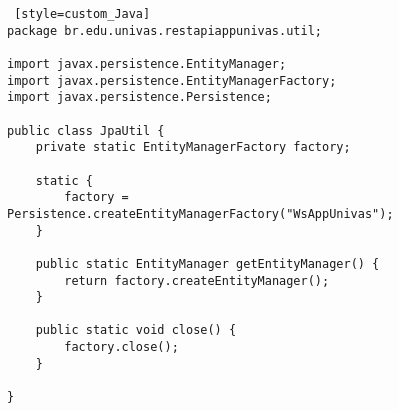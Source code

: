 
\begin{lstlisting} [style=custom_Java] 	
package br.edu.univas.restapiappunivas.util;

import javax.persistence.EntityManager;
import javax.persistence.EntityManagerFactory;
import javax.persistence.Persistence;

public class JpaUtil {
	private static EntityManagerFactory factory;

	static {
		factory = Persistence.createEntityManagerFactory("WsAppUnivas");
	}

	public static EntityManager getEntityManager() {
		return factory.createEntityManager();
	}

	public static void close() {
		factory.close();
	}

}
	
\end{lstlisting}